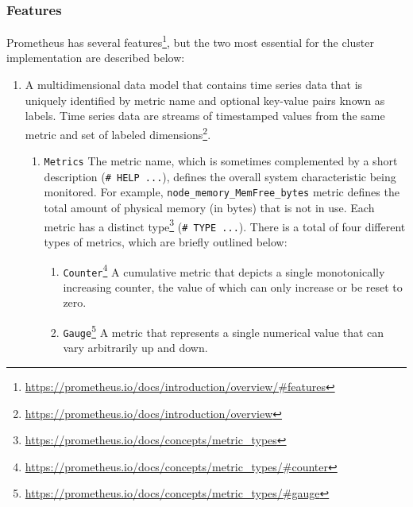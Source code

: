 \subsubsection{Features}
\label{subsubsec:implementation_dependencies_prometheus_features}

Prometheus has several features\footnote{\url{https://prometheus.io/docs/introduction/overview/\#features}},
but the two most essential for the cluster implementation are described below:
\begin{enumerate}
  \item A multidimensional data model that contains time series data that is uniquely
    identified by metric name and optional key-value pairs known as labels. Time
    series data are streams of timestamped values from the same metric and set
    of labeled dimensions\footnote{\url{https://prometheus.io/docs/introduction/overview}}.
    \begin{enumerate}
      \item \texttt{Metrics}
        \newline
        The metric name, which is sometimes complemented by a short description (\lstinline[language=prometheus]{# HELP ...}),
        defines the overall system characteristic being monitored.
        \newline
        For example, \lstinline[language=prometheus, alsoletter={_},
        morekeywords={node_memory_MemFree_bytes}]{node_memory_MemFree_bytes}
        metric defines the total amount of physical memory (in bytes) that is
        not in use.
        \newline
        Each metric has a distinct type\footnote{\url{https://prometheus.io/docs/concepts/metric_types}}
        (\lstinline[language=prometheus]{# TYPE ...}). There is a total of four
        different types of metrics, which are briefly outlined below:
        \begin{enumerate}
          \item \texttt{Counter}\footnote{\url{https://prometheus.io/docs/concepts/metric_types/\#counter}}
            \newline
            A cumulative metric that depicts a single monotonically increasing
            counter, the value of which can only increase or be reset to zero.

          \item \texttt{Gauge}\footnote{\url{https://prometheus.io/docs/concepts/metric_types/\#gauge}}
            \newline
            A metric that represents a single numerical value that can vary
            arbitrarily up and down.


\end{enumerate}
\end{enumerate}
\end{enumerate}

